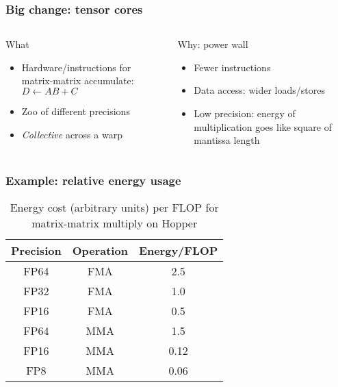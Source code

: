 \documentclass[aspectratio=169]{beamer}
\begin{document}
\begin{frame}
  \frametitle{Big change: tensor cores}
  \begin{columns}[t]
    \begin{column}{0.5\textwidth}
      \begin{block}{What}
        \begin{itemize}
        \item Hardware/instructions for matrix-matrix accumulate: $D \gets A B + C$
        \item Zoo of different precisions
        \item \emph{Collective} across a warp
        \end{itemize}
      \end{block}
    \end{column}
    \begin{column}{0.5\textwidth}
      \begin{block}{Why: power wall}
        \begin{itemize}
        \item Fewer instructions 
        \item Data access: wider loads/stores
        \item Low precision: energy of multiplication goes like
          square of mantissa length
        \end{itemize}
      \end{block}
    \end{column}
  \end{columns}
\end{frame}

\begin{frame}
  \frametitle{Example: relative energy usage}
  \begin{table}
    \centering
    \begin{tabular}{ccc}
      \toprule
      Precision & Operation & Energy/FLOP \\
      \midrule
      FP64 & FMA & 2.5 \\
      FP32 & FMA & 1.0 \\
      FP16 & FMA & 0.5 \\
      FP64 & MMA & 1.5 \\
      FP16 & MMA & 0.12 \\
      FP8 & MMA & 0.06 \\
      \bottomrule
    \end{tabular}
    \caption{Energy cost (arbitrary units) per FLOP for matrix-matrix multiply
      on Hopper}
  \end{table}
\end{frame}
\end{document}
